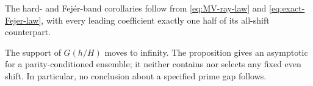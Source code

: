 The hard- and Fej\'er-band corollaries follow from
\eqref{eq:MV-ray-law} and \eqref{eq:exact-Fejer-law}, with every leading
coefficient exactly one half of its all-shift counterpart.

\begin{remark}
The support of $G(h/H)$ moves to infinity.  The proposition gives an
asymptotic for a parity-conditioned ensemble; it neither contains nor
selects any fixed even shift.  In particular, no conclusion about a
specified prime gap follows.
\end{remark}
